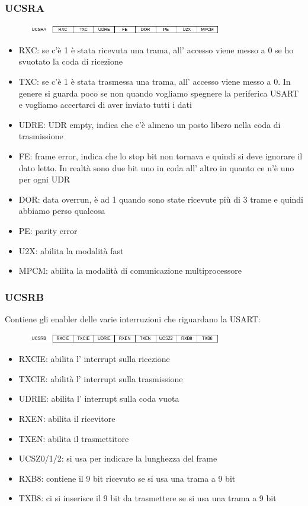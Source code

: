 \subsubsection{UCSRA}
\begin{figure}[H]
    \centering
    \includegraphics[width=320px]{images/22_USART/UCSRA.png}
\end{figure}
\begin{itemize}
    \item RXC: se c'è 1 è stata ricevuta una trama, all' accesso viene messo a 0 se ho svuotato la coda di ricezione
    \item TXC: se c'è 1 è stata trasmessa una trama, all' accesso viene messo a 0.
    In genere si guarda poco se non quando vogliamo spegnere la periferica USART e vogliamo accertarci di aver inviato tutti i dati
    \item UDRE: UDR empty, indica che c'è almeno un posto libero nella coda di trasmissione
    \item FE: frame error, indica che lo stop bit non tornava e quindi si deve ignorare il dato letto.
    In realtà sono due bit uno in coda all' altro in quanto ce n'è uno per ogni UDR
    \item DOR: data overrun, è ad 1 quando sono state ricevute più di 3 trame e quindi abbiamo perso qualcosa
    \item PE: parity error
    \item U2X: abilita la modalità fast
    \item MPCM: abilita la modalità di comunicazione multiprocessore
\end{itemize}

\subsubsection{UCSRB}
Contiene gli enabler delle varie interruzioni che riguardano la USART:
\begin{figure}[H]
    \centering
    \includegraphics[width=320px]{images/22_USART/UCSRB.png}
\end{figure}
\begin{itemize}
    \item RXCIE: abilita l' interrupt sulla ricezione
    \item TXCIE: abilità l' interrupt sulla trasmissione
    \item UDRIE: abilita l' interrupt sulla coda vuota
    \item RXEN: abilita il ricevitore
    \item TXEN: abilita il trasmettitore
    \item UCSZ0/1/2: si usa per indicare la lunghezza del frame
    \item RXB8: contiene il 9 bit ricevuto se si usa una trama a 9 bit
    \item TXB8: ci si inserisce il 9 bit da trasmettere se si usa una trama a 9 bit
\end{itemize}

